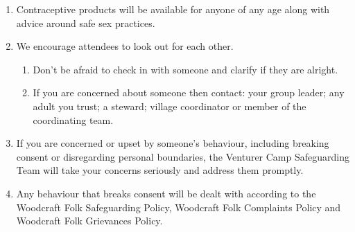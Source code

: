 \documentclass[a4paper, 11pt]{report}
\def\enumMarginIndentOne{4em}
\begin{document}
\begin{enumerate}
\begin{enumerate}[leftmargin=\enumMarginIndentOne]
        \end{enumerate}
        \item Contraceptive products will be available for anyone of any age along with advice around safe sex practices. 
        \item We encourage attendees to look out for each other.
        \begin{enumerate}[leftmargin=\enumMarginIndentOne]
            \item Don't be afraid to check in with someone and clarify if they are alright.
            \item If you are concerned about someone then contact:  your group leader; any adult you trust; a steward; village coordinator or member of the coordinating team.
        \end{enumerate}
        \item If you are concerned or upset by someone's behaviour, including breaking consent or disregarding personal boundaries, the Venturer Camp Safeguarding Team will take your concerns seriously and address them promptly.
        \item Any behaviour that breaks consent will be dealt with according to the Woodcraft Folk Safeguarding Policy, Woodcraft Folk Complaints Policy and Woodcraft Folk Grievances Policy.
    \end{enumerate}
\end{document}
